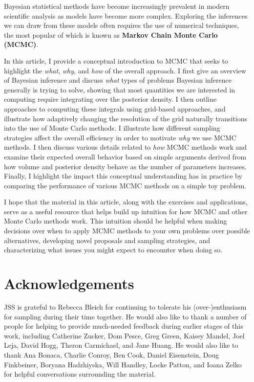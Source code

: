 \documentclass[12pt, titlepage]{article}
\begin{document}
Bayesian statistical methods have become increasingly prevalent in
modern scientific analysis as models have become more complex.
Exploring the inferences we can draw from these models often
requires the use of numerical techniques, the most popular of
which is known as \textbf{Markov Chain Monte Carlo (MCMC)}.

In this article, I provide a conceptual introduction
to MCMC that seeks to highlight the \textit{what}, \textit{why},
and \textit{how} of the overall approach. I first give
an overview of Bayesian inference and discuss \textit{what}
types of problems Bayesian inference generally is trying to solve, 
showing that most quantities we are interested in computing
require integrating over the posterior density.
I then outline approaches to computing these integrals using
grid-based approaches, and illustrate how adaptively changing
the resolution of the grid naturally transitions into 
the use of Monte Carlo methods. I illustrate how
different sampling strategies affect the overall efficiency
in order to motivate \textit{why} we use MCMC methods.
I then discuss various details related to \textit{how} MCMC methods 
work and examine their expected overall behavior based on
simple arguments derived from how volume and posterior density behave
as the number of parameters increases. 
Finally, I highlight the impact this conceptual understanding
has in practice by comparing the performance of various MCMC methods 
on a simple toy problem.

I hope that the material in this article, 
along with the exercises and applications,
serve as a useful resource that helps
build up intuition for how MCMC and other
Monte Carlo methods work.
This intuition should be helpful
when making decisions over when to apply MCMC methods to your own
problems over possible alternatives,
developing novel proposals and sampling strategies, 
and characterizing what issues you might
expect to encounter when doing so.

\section*{Acknowledgements}

JSS is grateful to Rebecca Bleich for continuing to tolerate his
(over-)enthusiasm for sampling during their time together. 
He would also like to thank a number of people for
helping to provide much-needed feedback during earlier stages
of this work, including Catherine Zucker, Dom Pesce, Greg Green,
Kaisey Mandel, Joel Leja, David Hogg, Theron Carmichael, and Jane Huang.
He would also like to thank Ana Bonaca, Charlie Conroy, Ben Cook,
Daniel Eisenstein, Doug Finkbeiner, Boryana Hadzhiyska, 
Will Handley, Locke Patton, and Ioana Zelko
for helpful conversations surrounding the material.
\end{document}
